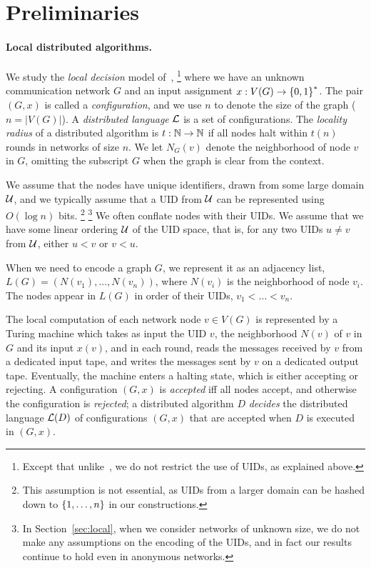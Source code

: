 \section{Preliminaries}
\label{sec:prelim}


\paragraph{Local distributed algorithms.}
We study the \emph{local decision} model of~\cite{fraigniaud2013towards},%
\footnote{Except that unlike~\cite{fraigniaud2013towards,balliu2018can},
we do not restrict the use of UIDs, as explained above.}
where we have an unknown communication network $G$ and an input assignment $x : V(G) \rightarrow \left \{{0,1} \right \}^*$.
The pair $(G, x)$ is called a \emph{configuration},
and we use $n$ to denote the size of the graph ($n = |V(G)|$).
A \emph{distributed language} $\mathcal{L}$ is a set of configurations.
The \emph{locality radius} of a distributed algorithm is $t : \mathbb{N} \rightarrow \mathbb{N}$
if all nodes halt within $t(n)$ rounds in networks of size $n$.
We let $N_G(v)$ denote the neighborhood of node $v$ in $G$, omitting the subscript $G$
when the graph is clear from the context.


We assume that the nodes have unique identifiers, drawn from some large domain $\mathcal{U}$,
and we typically assume that a UID from $\mathcal{U}$ can be represented using $O(\log n)$ bits.%
\footnote{This assumption is not essential, as UIDs from a larger domain can be hashed down to $\left \{{1,\ldots,n} \right \}$
in our constructions.}%
\footnote{In Section~\ref{sec:local}, when we consider networks of unknown size, we do not make
any assumptions on the encoding of the UIDs, and in fact our results continue to hold even
in anonymous networks.}
We often conflate nodes with their UIDs.
We assume that we have some linear ordering $\mathcal{U}$ of the UID space, that is, for any two UIDs $u \neq v$ from $\mathcal{U}$,
either $u < v$ or $v < u$.

When we need to encode a graph $G$, we represent it as an adjacency list, $L(G) = (N(v_1),\ldots,N(v_n))$,
where $N(v_i)$ is the neighborhood of node $v_i$.
The nodes appear in $L(G)$ in order of their UIDs, $v_1 < \ldots < v_n$.

The local computation of each network node $v \in V(G)$ is represented by a Turing machine which takes as input the UID $v$,
the neighborhood $N(v)$
of $v$ in $G$ and its input $x(v)$, and in each round, reads the messages received by $v$ from a dedicated input tape,
and writes the messages sent by $v$ on a dedicated output tape.
Eventually, the machine enters a halting state, which is either accepting or rejecting.
A configuration $(G, x)$ is \emph{accepted} iff all nodes accept, and otherwise the configuration is \emph{rejected};
a distributed algorithm $D$ \emph{decides} the distributed language $\mathcal{L}(D)$
of configurations $(G,x)$ that are accepted when $D$ is executed in $(G,x)$.

